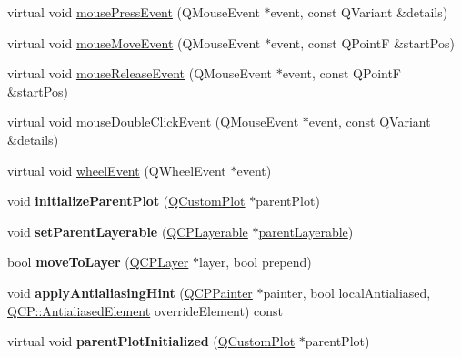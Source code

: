 \begin{DoxyCompactItemize}
\item 
virtual void \hyperlink{class_q_c_p_layerable_af6567604818db90f4fd52822f8bc8376}{mouse\+Press\+Event} (Q\+Mouse\+Event $\ast$event, const Q\+Variant \&details)
\item 
virtual void \hyperlink{class_q_c_p_layerable_a9eee1ba47fd69be111059ca3881933e4}{mouse\+Move\+Event} (Q\+Mouse\+Event $\ast$event, const Q\+PointF \&start\+Pos)
\item 
virtual void \hyperlink{class_q_c_p_layerable_aa0d79b005686f668622bbe66ac03ba2c}{mouse\+Release\+Event} (Q\+Mouse\+Event $\ast$event, const Q\+PointF \&start\+Pos)
\item 
virtual void \hyperlink{class_q_c_p_layerable_a4171e2e823aca242dd0279f00ed2de81}{mouse\+Double\+Click\+Event} (Q\+Mouse\+Event $\ast$event, const Q\+Variant \&details)
\item 
virtual void \hyperlink{class_q_c_p_layerable_a47dfd7b8fd99c08ca54e09c362b6f022}{wheel\+Event} (Q\+Wheel\+Event $\ast$event)
\item 
void {\bfseries initialize\+Parent\+Plot} (\hyperlink{class_q_custom_plot}{Q\+Custom\+Plot} $\ast$parent\+Plot)\hypertarget{class_q_c_p_layerable_a8cbe5a0c9a5674249982f5ca5f8e02bc}{}\label{class_q_c_p_layerable_a8cbe5a0c9a5674249982f5ca5f8e02bc}

\item 
void {\bfseries set\+Parent\+Layerable} (\hyperlink{class_q_c_p_layerable}{Q\+C\+P\+Layerable} $\ast$\hyperlink{class_q_c_p_layerable_a98d79f5b716d45eac4347befe546d0ec}{parent\+Layerable})\hypertarget{class_q_c_p_layerable_aa23c893671f1f6744ac235cf2204cf3a}{}\label{class_q_c_p_layerable_aa23c893671f1f6744ac235cf2204cf3a}

\item 
bool {\bfseries move\+To\+Layer} (\hyperlink{class_q_c_p_layer}{Q\+C\+P\+Layer} $\ast$layer, bool prepend)\hypertarget{class_q_c_p_layerable_af94484cfb7cbbddb7de522e9be71d9a4}{}\label{class_q_c_p_layerable_af94484cfb7cbbddb7de522e9be71d9a4}

\item 
void {\bfseries apply\+Antialiasing\+Hint} (\hyperlink{class_q_c_p_painter}{Q\+C\+P\+Painter} $\ast$painter, bool local\+Antialiased, \hyperlink{namespace_q_c_p_ae55dbe315d41fe80f29ba88100843a0c}{Q\+C\+P\+::\+Antialiased\+Element} override\+Element) const \hypertarget{class_q_c_p_layerable_a62bd552d1a45aa9accb24b310542279e}{}\label{class_q_c_p_layerable_a62bd552d1a45aa9accb24b310542279e}

\item 
virtual void {\bfseries parent\+Plot\+Initialized} (\hyperlink{class_q_custom_plot}{Q\+Custom\+Plot} $\ast$parent\+Plot)\hypertarget{class_q_c_p_layerable_ac504c8a0075c2fefbf941c4e599d218c}{}\label{class_q_c_p_layerable_ac504c8a0075c2fefbf941c4e599d218c}


\end{DoxyCompactItemize}
